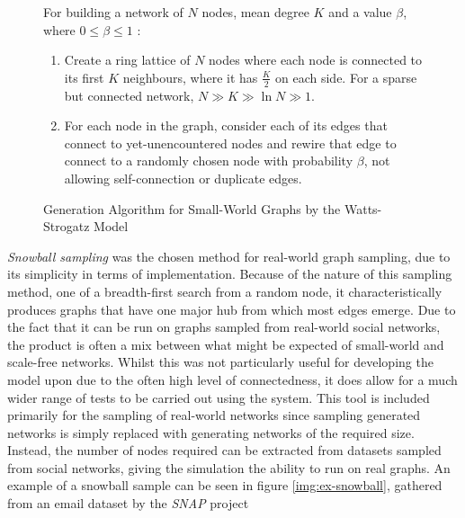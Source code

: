 \documentclass[]{report}
\begin{document}
\begin{figure}
For building a network of $N$ nodes, mean degree $K$ and a value $\beta$, where $0 \leq \beta \leq 1$ :
\begin{enumerate}
\item Create a ring lattice of $N$ nodes where each node is connected to its first $K$ neighbours, where it has $\frac{K}{2}$ on each side. For a sparse but connected network, $N \gg K \gg \ln{N} \gg 1$.
\item For each node in the graph, consider each of its edges that connect to yet-unencountered nodes and rewire that edge to connect to a randomly chosen node with probability $\beta$, not allowing self-connection or duplicate edges.
\end{enumerate}
\caption{Generation Algorithm for Small-World Graphs by the Watts-Strogatz Model~\cite{BAStat}}
\label{code:sw-code}
\end{figure}

\emph{Snowball sampling} was the chosen method for real-world graph sampling, due to its simplicity in terms of implementation. Because of the nature of this sampling method, one of a breadth-first search from a random node, it characteristically produces graphs that have one major hub from which most edges emerge. Due to the fact that it can be run on graphs sampled from real-world social networks, the product is often a mix between what might be expected of small-world and scale-free networks. Whilst this was not particularly useful for developing the model upon due to the often high level of connectedness, it does allow for a much wider range of tests to be carried out using the system. This tool is included primarily for the sampling of real-world networks since sampling generated networks is simply replaced with generating networks of the required size. Instead, the number of nodes required can be extracted from datasets sampled from social networks, giving the simulation the ability to run on real graphs. An example of a snowball sample can be seen in figure \ref{img:ex-snowball}, gathered from an email dataset by the \emph{SNAP} project~\cite{SNAP-email}
\end{document}
